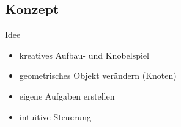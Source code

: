 \documentclass[18pt]{beamer}
\begin{document}
\subsection{Konzept}
\begin{frame}{Idee}
\begin{itemize}
\item kreatives Aufbau- und Knobelspiel
\item geometrisches Objekt verändern (Knoten)
\item eigene Aufgaben erstellen
\item intuitive Steuerung
\end{itemize}
\end{frame}


\end{document}
